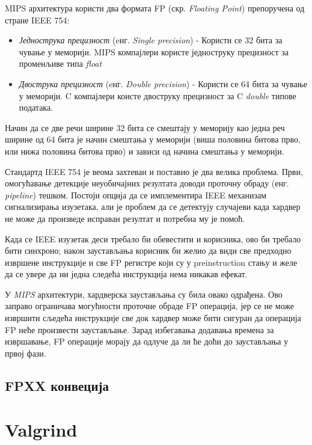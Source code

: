 \documentclass[12pt,oneside]{memoir}
\begin{document}
MIPS архитектура користи два формата FP (скр. \textit{Floating Point}) препоручена од стране IEEE 754:

\begin{itemize}
	\item \textit{Једнострука прецизност} (eнг. \textit{Single precision}) - Користи се 32 бита за чување у меморији. MIPS компајлери користе једноструку прецизност за променљиве типа \textit{float}
	\item \textit{Двострука прецизност} (eнг. \textit{Double precision}) - Користи се 64 бита за чување у меморији. C компајлери коисте двоструку прецизност за C \textit{double} типове података.
\end{itemize}

\indent Начин да се две речи ширине 32 бита се смештају у меморију као једна реч ширине од 64 бита је начин смештања у меморији (виша половина битова прво, или нижа половина битова прво) и зависи од начина смештања у меморији. 

\indent Стандартд IEEE 754 је веома захтеван и поставио је два велика проблема. Први, омогућавање детекције неуобичајних резултата доводи проточну обраду (енг. \textit{pipeline}) тешком. Постоји опција да се имплементира IEEE механизам сигнализирања изузетака, али је проблем да се детектују случајеви када хардвер не може да произведе исправан резултат и потребна му је помоћ.

\indent Када се IEEE изузетак деси требало би обевестити и корисника, ово би требало бити синхроно; након заустављања корисник би желио да види све предходно извршене инструкције и све FP регистре који су у preinstruction стању и желе да се увере да ни једна следећа инструкција нема никакав ефекат.

\indent У \textit{MIPS} архитектури, хардверска заустављања су била овако одрађена. Ово заправо ограничава могућности проточне обраде FP операција, јер се не може извршити сљедећа инструкције све док хардвер може бити сигуран да операција FP неће произвести заустављање. Зарад избегавања додавања времена за извршавање, FP операције морају да одлуче да ли ће доћи до заустављања у првој фази. 




\section{FPXX конвеција}

\chapter{Valgrind}
\label{chp:valgrind}
\end{document}
